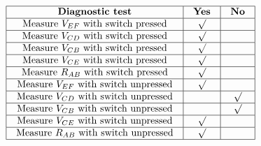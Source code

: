 \vfil 

\eject







$$\vbox{\offinterlineskip
\halign{\strut
\vrule \quad\hfil # \ \hfil & 
\vrule \quad\hfil # \ \hfil & 
\vrule \quad\hfil # \ \hfil \vrule \cr
\noalign{\hrule}
%
{\bf Diagnostic test} & {\bf Yes} & {\bf No} \cr
%
\noalign{\hrule}
%
Measure $V_{EF}$ with switch pressed & $\surd$ &  \cr
%
\noalign{\hrule}
%
Measure $V_{CD}$ with switch pressed & $\surd$ &  \cr
%
\noalign{\hrule}
%
Measure $V_{CB}$ with switch pressed & $\surd$ &  \cr
%
\noalign{\hrule}
%
Measure $V_{CE}$ with switch pressed & $\surd$ &  \cr
%
\noalign{\hrule}
%
Measure $R_{AB}$ with switch pressed & $\surd$ &  \cr
%
\noalign{\hrule}
%
Measure $V_{EF}$ with switch unpressed & $\surd$ &  \cr
%
\noalign{\hrule}
%
Measure $V_{CD}$ with switch unpressed &  & $\surd$ \cr
%
\noalign{\hrule}
%
Measure $V_{CB}$ with switch unpressed &  & $\surd$ \cr
%
\noalign{\hrule}
%
Measure $V_{CE}$ with switch unpressed & $\surd$ &  \cr
%
\noalign{\hrule}
%
Measure $R_{AB}$ with switch unpressed & $\surd$ &  \cr
%
\noalign{\hrule}
} %
}$$ %











